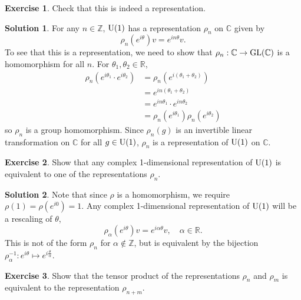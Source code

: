 \documentclass[11pt, a4paper]{report}
\theoremstyle{definition}
\newtheorem{exercise}{Exercise}[part]
\newtheorem{solution}{Solution}[part]
\newenvironment{ex}{\begin{exercise}}{\end{exercise}\pagebreak[1]}
\newenvironment{sol}{\begin{solution}}{\end{solution}\pagebreak[3]}
\newcommand*{\GL}{\ensuremath\text{GL}}
\newcommand*{\U}{\ensuremath\text{U}}
\begin{document}
\begin{ex}

Check that this is indeed a representation.

\end{ex}

\begin{sol}

For any $n \in \mathbb{Z}$, $\U(1)$ has a representation $\rho_n$ on $\mathbb{C}$ given by
\[
    \rho_n(e^{i\theta}) v = e^{in\theta} v.
\]
To see that this is a representation, we need to show that $\rho_n: \mathbb{C} \to \GL(\mathbb{C})$ is a homomorphism for all $n$.
For $\theta_1, \theta_2 \in \mathbb{R}$,
\begin{align*}
    \rho_n(e^{i\theta_1} \cdot e^{i\theta_2}) &= \rho_n(e^{i(\theta_1 + \theta_2)}) \\
        &= e^{in(\theta_1 + \theta_2)} \\
        &= e^{in\theta_1} \cdot e^{in\theta_2} \\
        &= \rho_n(e^{i\theta_1}) \rho_n(e^{i\theta_2})
\end{align*}
so $\rho_n$ is a group homomorphism. Since $\rho_n(g)$ is an invertible linear transformation on $\mathbb{C}$ for all $g \in \U(1)$, $\rho_n$ is a representation of $\U(1)$ on $\mathbb{C}$.

\end{sol}

\begin{ex}

Show that any complex 1-dimensional representation of $\U(1)$ is equivalent to one of the representations $\rho_n$.

\end{ex}

\begin{sol}

Note that since $\rho$ is a homomorphism, we require $\rho(1) = \rho(e^{i0}) = 1$.
Any complex 1-dimensional representation of $\U(1)$ will be a rescaling of $\theta$,
\[
    \rho_\alpha(e^{i\theta}) v = e^{i\alpha\theta}v, \quad \alpha \in \mathbb{R}.
\]
This is not of the form $\rho_n$ for $\alpha \not\in \mathbb{Z}$, but is equivalent by the bijection $\rho_\alpha^{-1}: e^{i\theta} \mapsto e^{i \frac{\theta}{\alpha}}$.

\end{sol}

\begin{ex}

Show that the tensor product of the representations $\rho_n$ and $\rho_m$ is equivalent to the representation $\rho_{n + m}$.

\end{ex}
\end{document}
